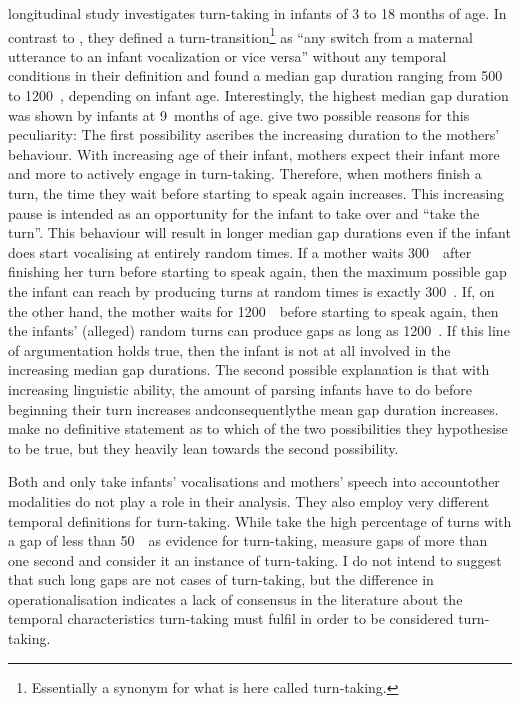  longitudinal study investigates turn-taking in infants of 3 to 18 months of age.
In contrast to \citet{gratier_early_2015}, they defined a turn-transition\footnote{Essentially a synonym for what is here called turn-taking.} as ``any switch from a maternal utterance to an infant vocalization or vice versa'' \citep[]{hilbrink_early_2015} without any temporal conditions in their definition and found a median gap duration ranging from 500 to 1200~\ms, depending on infant age.
Interestingly, the highest median gap duration was shown by infants at 9~months of age.
\citet{hilbrink_early_2015} give two possible reasons for this peculiarity:
The first possibility ascribes the increasing duration to the mothers' behaviour.
With increasing age of their infant, mothers expect their infant more and more to actively engage in turn-taking.
Therefore, when mothers finish a turn, the time they wait before starting to speak again increases.
This increasing pause is intended as an opportunity for the infant to take over and ``take the turn''.
This behaviour will result in longer median gap durations even if the infant does start vocalising at entirely random times.
If a mother waits 300~\ms\ after finishing her turn before starting to speak again, then the maximum possible gap the infant can reach by producing turns at random times is exactly 300~\ms.
If, on the other hand, the mother waits for 1200~\ms\ before starting to speak again, then the infants' (alleged) random turns can produce gaps as long as 1200~\ms.
If this line of argumentation holds true, then the infant is not at all involved in the increasing median gap durations.
The second possible explanation is that with increasing linguistic ability, the amount of parsing infants have to do before beginning their turn increases and\dash consequently\dash the mean gap duration increases.
\citet[]{hilbrink_early_2015} make no definitive statement as to which of the two possibilities they hypothesise to be true, but they heavily lean towards the second possibility.

Both \citet{gratier_early_2015} and \citet{hilbrink_early_2015} only take infants' vocalisations and mothers' speech into account\dash other modalities do not play a role in their analysis.
They also employ very different temporal definitions for turn-taking.
While \citet{gratier_early_2015} take the high percentage of turns with a gap of less than 50~\ms\ as evidence for turn-taking, \citet{hilbrink_early_2015} measure gaps of more than one second and consider it an instance of turn-taking.
I do not intend to suggest that such long gaps are not cases of turn-taking, but the difference in operationalisation indicates a lack of consensus in the literature about the temporal characteristics turn-taking must fulfil in order to be considered turn-taking.


